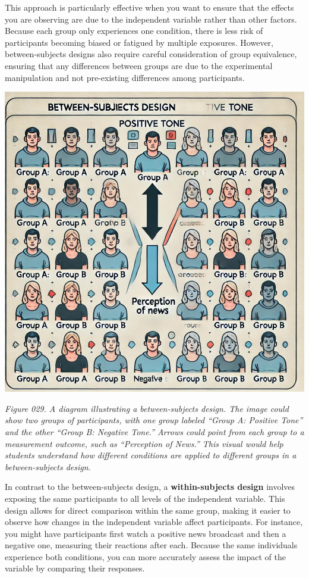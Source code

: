 \documentclass[
]{book}
\begin{document}
This approach is particularly effective when you want to ensure that the effects you are observing are due to the independent variable rather than other factors. Because each group only experiences one condition, there is less risk of participants becoming biased or fatigued by multiple exposures. However, between-subjects designs also require careful consideration of group equivalence, ensuring that any differences between groups are due to the experimental manipulation and not pre-existing differences among participants.

\includegraphics[width=1\linewidth,height=\textheight,keepaspectratio]{images/fig029.jpg}

\emph{Figure 029. A diagram illustrating a between-subjects design. The image could show two groups of participants, with one group labeled ``Group A: Positive Tone'' and the other ``Group B: Negative Tone.'' Arrows could point from each group to a measurement outcome, such as ``Perception of News.'' This visual would help students understand how different conditions are applied to different groups in a between-subjects design.}

In contrast to the between-subjects design, a \textbf{within-subjects design} involves exposing the same participants to all levels of the independent variable. This design allows for direct comparison within the same group, making it easier to observe how changes in the independent variable affect participants. For instance, you might have participants first watch a positive news broadcast and then a negative one, measuring their reactions after each. Because the same individuals experience both conditions, you can more accurately assess the impact of the variable by comparing their responses.
\end{document}
